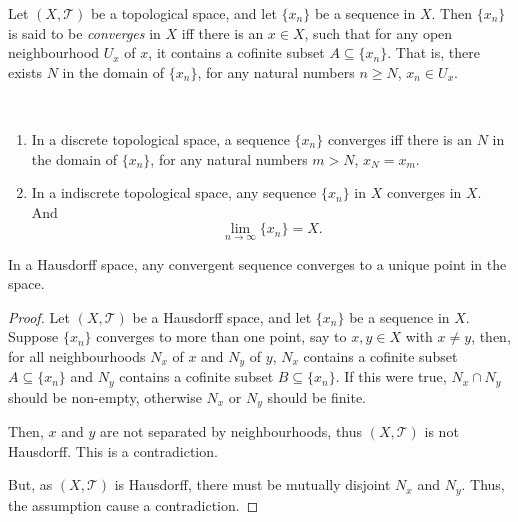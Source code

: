 \begin{definition}
	\label{def: convergence of sequences}
	Let $(X, \mathcal T)$ be a topological space, and let $\{x_n\}$ be a sequence in $X$. Then $\{x_n\}$ is said to be \textit{converges} in $X$ iff there is an $x \in X$, such that for any open neighbourhood $U_x$ of $x$, it contains a cofinite subset $A \subseteq \{x_n\}$. That is, there exists $N$ in the domain of $\{x_n\}$, for any natural numbers $n \ge N$, $x_n \in U_x$.
\end{definition}


\begin{example}
	\
	\begin{enumerate}
		\item
		In a discrete topological space, a sequence $\{x_n\}$ converges iff there is an $N$ in the domain of $\{x_n\}$, for any natural numbers $m > N$, $x_N = x_m$.
		
		\item
		In a indiscrete topological space, any sequence $\{x_n\}$ in $X$ converges in $X$. And
		$$
		\lim_{n \to \infty} \{x_n\} = X.
		$$
	\end{enumerate}
\end{example}


\begin{proposition}
	In a Hausdorff space, any convergent sequence converges to a unique point in the space.
	
	\begin{proof}
		Let $(X, \mathcal T)$ be a Hausdorff space, and let $\{x_n\}$ be a sequence in $X$. Suppose $\{x_n\}$ converges to more than one point, say to $x, y \in X$ with $x \ne y$, then, for all neighbourhoods $N_x$ of $x$ and $N_y$ of $y$, $N_x$ contains a cofinite subset $A \subseteq \{x_n\}$ and $N_y$ contains a cofinite subset $B \subseteq \{x_n\}$. If this were true, $N_x \cap N_y$ should be non-empty, otherwise $N_x$ or $N_y$ should be finite.
		
		Then, $x$ and $y$ are not separated by neighbourhoods, thus $(X, \mathcal T)$ is not Hausdorff. This is a contradiction.
		
		But, as $(X, \mathcal T)$ is Hausdorff, there must be mutually disjoint $N_x$ and $N_y$. Thus, the assumption cause a contradiction.
	\end{proof}
\end{proposition}


